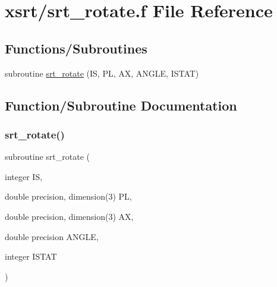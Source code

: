 \hypertarget{srt__rotate_8f}{}\section{xsrt/srt\+\_\+rotate.f File Reference}
\label{srt__rotate_8f}
\subsection*{Functions/\+Subroutines}
\begin{DoxyCompactItemize}
\item 
subroutine \hyperlink{srt__rotate_8f_aabd13dca238485644d42ba903bc0b388}{srt\+\_\+rotate} (IS, PL, AX, A\+N\+G\+LE, I\+S\+T\+AT)
\end{DoxyCompactItemize}


\subsection{Function/\+Subroutine Documentation}
\mbox{\label{srt__rotate_8f_aabd13dca238485644d42ba903bc0b388}} 
\subsubsection{\texorpdfstring{srt\+\_\+rotate()}{srt\_rotate()}}
{\footnotesize\ttfamily subroutine srt\+\_\+rotate (\begin{DoxyParamCaption}\item[{integer}]{IS,  }\item[{double precision, dimension(3)}]{PL,  }\item[{double precision, dimension(3)}]{AX,  }\item[{double precision}]{A\+N\+G\+LE,  }\item[{integer}]{I\+S\+T\+AT }\end{DoxyParamCaption})}

